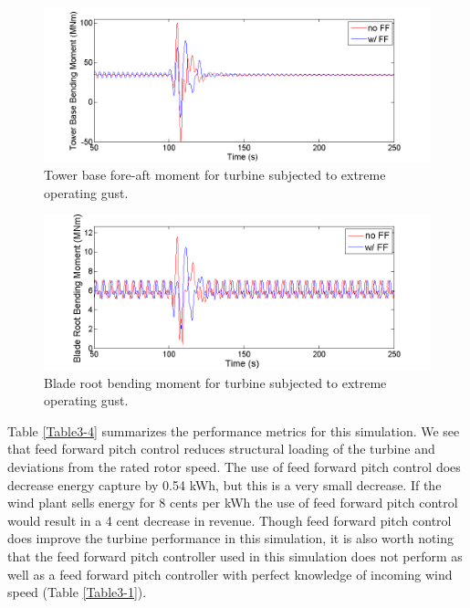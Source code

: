 \begin{figure}[htbp]
	\centering
		\includegraphics[width = \linewidth]{Figures/ch3Figures/fig3-28.png}
		
	\caption{Tower base fore-aft moment for turbine subjected to extreme operating gust.}
	\label{fig3-28}
\end{figure}

\begin{figure}[htbp]
	\centering
		\includegraphics[width = \linewidth]{Figures/ch3Figures/fig3-29.png}
		
	\caption{Blade root bending moment for turbine subjected to extreme operating gust.}
	\label{fig3-29}
\end{figure}

Table \ref{Table3-4} summarizes the performance metrics for this simulation. We see that feed forward pitch control reduces structural loading of the turbine and deviations from the rated rotor speed. The use of feed forward pitch control does decrease energy capture by 0.54 kWh, but this is a very small decrease. If the wind plant sells energy for 8 cents per kWh the use of feed forward pitch control would result in a 4 cent decrease in revenue. Though feed forward pitch control does improve the turbine performance in this simulation, it is also worth noting that the feed forward pitch controller used in this simulation does not perform as well as a feed forward pitch controller with perfect knowledge of incoming wind speed (Table \ref{Table3-1}).

